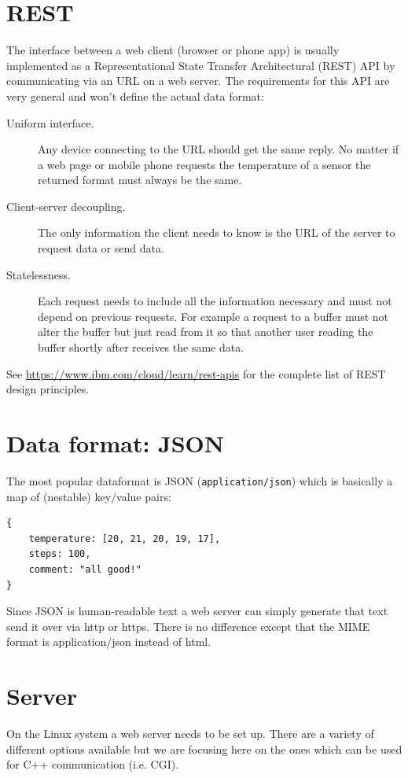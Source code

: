 \documentclass[12pt]{report}
\begin{document}
\section{REST}
The interface between a web client (browser or phone app) is usually
implemented as a Representational State Transfer Architectural (REST)
API by communicating via an URL on a web server. The requirements
for this API are very general and won't define the actual data format:
\begin{description}
\item[Uniform interface.] Any device connecting to the URL should
  get the same reply. No matter if a web page or mobile phone
  requests the temperature of a sensor the returned format must always be the same.
\item[Client-server decoupling.] The only information
  the client needs to know is the URL of the server to request data or send data.
\item[Statelessness.] Each request needs to include all the
  information necessary and must not depend on previous requests. For
  example a request to a buffer must not alter the
  buffer but just read from it so that another user reading the buffer
  shortly after receives the same data.
\end{description}
See \url{https://www.ibm.com/cloud/learn/rest-apis} for the complete
list of REST design principles.

\section{Data format: JSON}
The most popular dataformat is JSON (\texttt{application/json}) which
is basically a map of (nestable) key/value pairs:
\begin{verbatim}
{
    temperature: [20, 21, 20, 19, 17],
    steps: 100,
    comment: "all good!"
}
\end{verbatim}
Since JSON is human-readable text a web server can simply
generate that text send it over via http or https. There
is no difference except that the MIME format is \textquotesingle application/json\textquotesingle{}
instead of html.

\section{Server}
On the Linux system a web server needs to be set up. There are
a variety of different options available but we are focusing here
on the ones which can be used for C++ communication (i.e. CGI).
\end{document}
